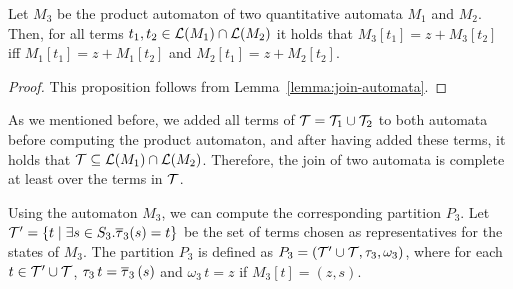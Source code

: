 \begin{proposition}\label{prop:join-automata}
    Let $M_3$ be the product automaton of two quantitative automata $M_1$ and $M_2$.
    Then, for all terms $t_1, t_2 \in \mathcal{L}(M_1) \cap \mathcal{L}(M_2)$ it holds that $M_3[t_1] = z + M_3[t_2]$ iff $M_1[t_1] = z + M_1[t_2]$ and $M_2[t_1] = z + M_2[t_2]$.
\end{proposition}
\begin{proof}
    This proposition follows from Lemma~\ref{lemma:join-automata}.
\end{proof}

As we mentioned before, we added all terms of $\mathcal{T} = \mathcal{T}_1 \cup \mathcal{T}_2$ to both automata before computing the product automaton, and after having added these terms, it holds that $\mathcal{T} \subseteq \mathcal{L}(M_1) \cap \mathcal{L}(M_2)$.
Therefore, the join of two automata is complete at least over the terms in $\mathcal{T}$.

Using the automaton $M_3$, we can compute the corresponding partition $P_3$.
Let $\mathcal{T}' = \{t \mid \exists s \in S_3 . \overline{\tau}_3(s) = t\}$ be the set of terms chosen as representatives for the states of $M_3$.
The partition $P_3$ is defined as $P_3 = (\mathcal{T}' \cup \mathcal{T}, \tau_3, \omega_3)$,
where for each $t \in \mathcal{T}' \cup \mathcal{T}$, $\tau_3\,t = \overline{\tau}_3\,(s)$ and $\omega_3\,t = z$ if $M_3[t] = (z,s)$.


